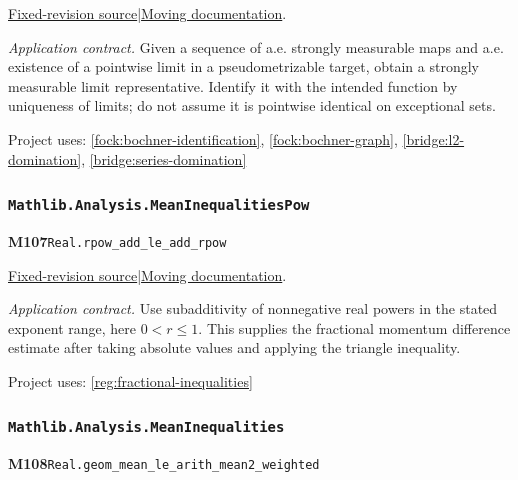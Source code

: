\documentclass[11pt,a4paper]{article}
\theoremstyle{definition}
\theoremstyle{remark}
\begin{document}
\href{https://github.com/leanprover-community/mathlib4/blob/9bac2d0692944a775113f7c130fd5e5b4608a854/Mathlib/MeasureTheory/Function/StronglyMeasurable/AEStronglyMeasurable.lean}{Fixed-revision source}\quad|\quad\href{https://leanprover-community.github.io/mathlib4_docs/Mathlib/MeasureTheory/Function/StronglyMeasurable/AEStronglyMeasurable.html#exists_stronglyMeasurable_limit_of_tendsto_ae}{Moving documentation}.\par
\noindent\textit{Application contract.} Given a sequence of a.e. strongly measurable maps and a.e. existence of a pointwise limit in a pseudometrizable target, obtain a strongly measurable limit representative. Identify it with the intended function by uniqueness of limits; do not assume it is pointwise identical on exceptional sets.\par
{\small Project uses: \ref{fock:bochner-identification}, \ref{fock:bochner-graph}, \ref{bridge:l2-domination}, \ref{bridge:series-domination}}\par\medskip

\subsubsection*{\nolinkurl{Mathlib.Analysis.MeanInequalitiesPow}}
\noindent\textbf{M107}\label{base:M107}\quad\nolinkurl{Real.rpow_add_le_add_rpow}

\href{https://github.com/leanprover-community/mathlib4/blob/9bac2d0692944a775113f7c130fd5e5b4608a854/Mathlib/Analysis/MeanInequalitiesPow.lean}{Fixed-revision source}\quad|\quad\href{https://leanprover-community.github.io/mathlib4_docs/Mathlib/Analysis/MeanInequalitiesPow.html#Real.rpow_add_le_add_rpow}{Moving documentation}.\par
\noindent\textit{Application contract.} Use subadditivity of nonnegative real powers in the stated exponent range, here $0<r\leq1$. This supplies the fractional momentum difference estimate after taking absolute values and applying the triangle inequality.\par
{\small Project uses: \ref{reg:fractional-inequalities}}\par\medskip

\subsubsection*{\nolinkurl{Mathlib.Analysis.MeanInequalities}}
\noindent\textbf{M108}\label{base:M108}\quad\nolinkurl{Real.geom_mean_le_arith_mean2_weighted}
\end{document}
